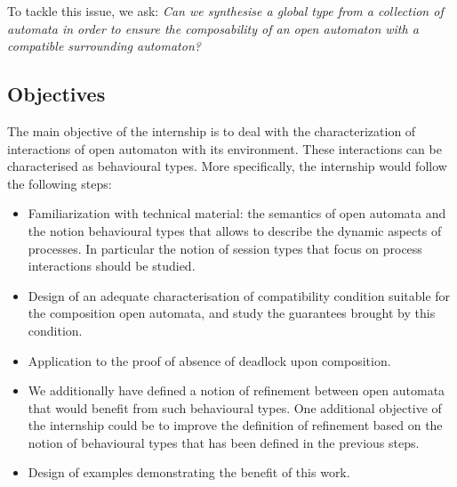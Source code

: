 \documentclass[11pt,fleqn]{article}
\begin{document}
 
To tackle this issue, we ask: { \it Can we synthesise a global type from a collection of automata in order to ensure the composability of an open automaton  with a compatible  surrounding automaton? }



\subsection*{Objectives}

The main objective of the internship is to deal with the characterization of interactions  of open automaton with its environment. These interactions can be characterised as behavioural types.
More specifically, the internship would follow the following steps:
\begin{itemize}
\item Familiarization with technical material: the semantics of  open automata and the notion behavioural types \cite{Hans:2016} that allows to describe the dynamic aspects of processes. In particular the notion of session types that focus on process interactions should be studied.

\item Design of an adequate characterisation of  compatibility condition  suitable for the composition open automata, and study the guarantees brought by this condition. 

\item Application to the proof of absence of deadlock upon composition.

\item  We additionally have defined a notion of refinement between open automata that would benefit from such behavioural types. One additional objective of the internship could be to improve the definition of refinement based on the notion of behavioural types that has been defined in the previous steps.

\item Design of examples demonstrating the benefit of this work.




\end{itemize}
 
\end{document}
